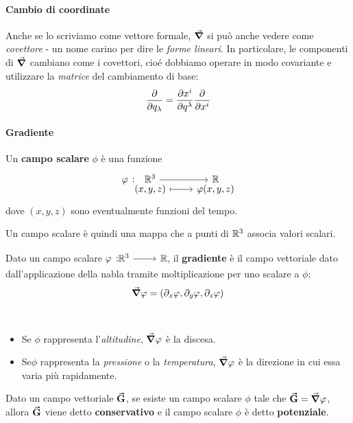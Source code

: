 \paragraph{Cambio di coordinate} %
Anche se lo scriviamo come vettore formale, $\grad$ si può anche vedere come \textit{covettore} - un nome carino per dire le \textit{forme lineari}. In particolare, le componenti di $\grad$ cambiano come i covettori, cioé dobbiamo operare in modo covariante e utilizzare la \textit{matrice} del cambiamento di base:
\begin{equation}
	\pdv{q_\lambda}=\pdv{x^i}{q^\lambda}\pdv{x^i}
\end{equation}
\paragraph{Gradiente}
\begin{define}
	Un \textbf{campo scalare} $\phi$ è una funzione
	\begin{equation}
		\funztot[\phi]{\realset^3}{\realset}{(x,y,z)}{\phi(x,y,z)}
	\end{equation}
	dove $(x,y,z)$ sono eventualmente funzioni del tempo.
\end{define}
Un campo scalare è quindi una mappa che a punti di $\mathbb{R}^3$ associa valori scalari.
\begin{define}[Gradiente]\label{gradiente}
	Dato un campo scalare $\funz[\phi]{\realset^3}{\realset}$, il \textbf{gradiente} è il campo vettoriale dato dall'applicazione della nabla tramite moltiplicazione per uno scalare a $\phi$:
	\begin{equation}
		\grad{\varphi}=\left(\partial_x\varphi,\partial_y\varphi,\partial_z\varphi\right)
	\end{equation}
\end{define}
\begin{examples}~
	\begin{itemize}
		\item Se $\phi$ rappresenta l'\textit{altitudine}, $\grad{\varphi}$ è la discesa.
		\item Se$\phi$ rappresenta la \textit{pressione} o la \textit{temperatura}, $\grad{\varphi}$ è la direzione in cui essa varia più rapidamente.
	\end{itemize}
\end{examples}
\begin{define}
	Dato un campo vettoriale $\vb*{\va{G}}$, se esiste un campo scalare $\phi$ tale che $\vb*{\va{G}}=\grad{\varphi}$, allora $\vb*{\va{G}}$ viene detto \textbf{conservativo} e il campo scalare $\phi$ è detto \textbf{potenziale}.
\end{define}
